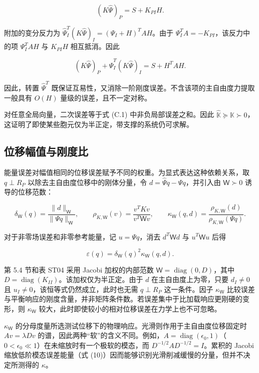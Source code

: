 \documentclass[preprint,12pt,authoryear]{elsarticle}
\begin{document}
\[
(K\widehat\Psi)_P=S+K_{PI}H.
\]

附加的变分反力为 \(\widehat\Psi_I^T(K\widehat\Psi)_I=(\Psi_I+H)^TAH\)。由于 \(\Psi_I^TA=-K_{PI}\)，该反力中的项 \(\Psi_I^TAH\) 与 \(K_{PI}H\) 相互抵消。因此

\[
(K\widehat\Psi)_P+\widehat\Psi_I^T(K\widehat\Psi)_I=S+H^TAH.
\tag{B.6}
\]

因此，转置 \(\widehat\Psi^T\) 既保证互易性，又消除一阶刚度误差。不含该项的主自由度力提取一般具有 \(O(H)\) 量级的误差，且不一定对称。

对任意全局向量，二次误差等于式 (C.1) 中非负局部误差之和。因此 \(\widehat{\mathbb K}\succeq\mathbb K\succ0\)，这证明了即使某些胞元仅为半正定，带支撑的系统仍可求解。

\subsection{位移幅值与刚度比}

能量误差对幅值相同的位移误差赋予不同的权重。为显式表达这种依赖关系，取 \(q\perp R_P\) 以除去主自由度位移中的刚体分量，令 \(d=\widehat\Psi q-\Psi q\)，并引入由 \(\mathsf W\succ0\) 诱导的位移范数：

\[
\delta_{\mathsf W}(q)=\frac{\|d\|_{\mathsf W}}{\|\Psi q\|_{\mathsf W}},\qquad
\rho_{K,\mathsf W}(v)=\frac{v^TKv}{v^T\mathsf Wv},\qquad
\kappa_{\mathsf W}(q,d)=\frac{\rho_{K,\mathsf W}(d)}{\rho_{K,\mathsf W}(\Psi q)}.
\tag{B.7}
\]

对于非零场误差和非零参考能量，记 \(u=\Psi q\)，消去 \(d^T\mathsf Wd\) 与 \(u^T\mathsf Wu\) 后得

\[
\boxed{\varepsilon(q)=\delta_{\mathsf W}(q)^2\kappa_{\mathsf W}(q,d).}
\tag{B.8}
\]

第 5.4 节和表 ST04 采用 Jacobi 加权的内部范数 \(\mathsf W=\operatorname{diag}(0,D)\)，其中 \(D=\operatorname{diag}(K_{II})\)。该加权仅为半正定。由于 \(d\) 在主自由度上为零，只要 \(d_I\ne0\) 且 \(u_I\ne0\)，该恒等式仍然成立，此时也无需 \(q\perp R_P\) 这一条件。因子 \(\kappa_{\mathsf W}\) 比较误差与平衡响应的刚度含量，并非矩阵条件数。若误差集中于比加载响应更刚硬的变形，则 \(\kappa_{\mathsf W}\) 较大，此时即使较小的相对位移误差在力学上也不可忽略。

\(\kappa_{\mathsf W}\) 的分母度量所选测试位移下的物理响应。光滑则作用于主自由度位移固定时 \(Av=\lambda Dv\) 的谱，因此两种``软''的含义不同。例如，\(A=\operatorname{diag}(\epsilon_0,1)\)（\(0<\epsilon_0\ll1\)）在未缩放时有一个极软的模态，而 \(D^{-1/2}AD^{-1/2}=I\)。累积的 Jacobi 缩放低阶模态误差能量（式 (10)）因而能够识别光滑削减缓慢的分量，但并不决定所测得的 \(\kappa\)。
\end{document}
